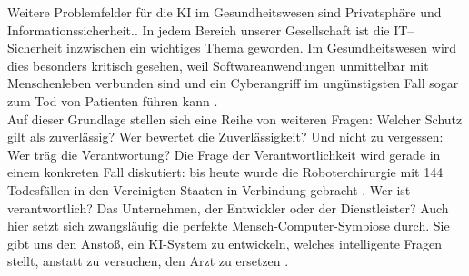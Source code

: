 Weitere Problemfelder für die KI im Gesundheitswesen sind Privatsphäre und Informationssicherheit.\cite{Opportunities_challenges_ai_hc}. In jedem Bereich unserer Gesellschaft ist die IT–Sicherheit inzwischen ein wichtiges Thema geworden. Im Gesundheitswesen wird dies besonders kritisch gesehen, weil Softwareanwendungen unmittelbar mit Menschenleben verbunden sind und ein Cyberangriff im ungünstigsten Fall sogar zum Tod von Patienten führen kann \cite{Opportunities_challenges_ai_hc}.\\
Auf dieser Grundlage stellen sich eine Reihe von weiteren Fragen: Welcher Schutz gilt als zuverlässig? Wer bewertet die Zuverlässigkeit? Und nicht zu vergessen: Wer träg die Verantwortung? 
Die Frage der Verantwortlichkeit wird gerade in einem konkreten Fall diskutiert: bis heute wurde die Roboterchirurgie mit 144 Todesfällen in den Vereinigten Staaten in Verbindung gebracht \cite{Chapter_14}. Wer ist verantwortlich? Das Unternehmen, der Entwickler oder der Dienstleister? Auch hier setzt sich zwangsläufig die perfekte Mensch-Computer-Symbiose durch. Sie gibt uns den Anstoß, ein KI-System zu entwickeln, welches intelligente Fragen stellt, anstatt zu versuchen, den Arzt zu ersetzen \cite{Chapter_14}.\\
